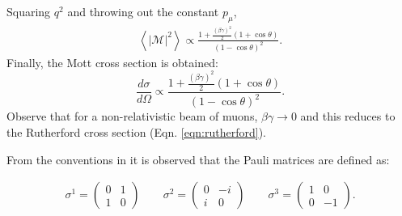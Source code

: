 Squaring $q^2$ and throwing out the constant $p_\mu$,
\begin{align*}
\left< |\mathcal{M}|^2\right> \propto \frac{1+\frac{(\beta\gamma)^2}{2} (1+\cos\theta)  }{(1-\cos\theta)^2}.
\end{align*}
Finally, the Mott cross section is obtained:
\begin{equation}\label{eqn:MottCrossSection_apx}
\frac{d\sigma}{d\Omega} \propto \frac{1+\frac{(\beta\gamma)^2}{2} (1+\cos\theta)  }{(1-\cos\theta)^2}.
\end{equation}
Observe that for a non-relativistic beam of muons, $\beta\gamma \rightarrow 0$ and this reduces to the Rutherford cross section (Eqn. \ref{eqn:rutherford}).
\label{apx:explicitMatrices}

From the conventions in \cite{griffithspp}
it is observed that
the Pauli matrices are defined as:

\begin{align*}
\sigma^1=
\begin{pmatrix}
0 & 1\\
1 & 0
\end{pmatrix}
\qquad
\sigma^2=
\begin{pmatrix}
0 & -i\\
i & 0
\end{pmatrix}
\qquad
\sigma^3=
\begin{pmatrix}
1 & 0\\
0 & -1
\end{pmatrix}
.
\end{align*}

